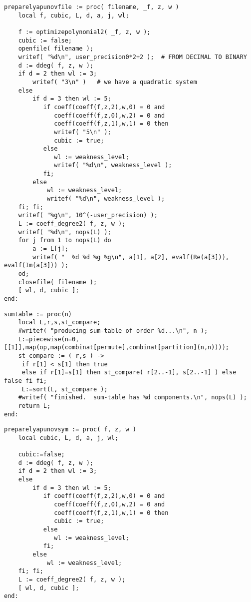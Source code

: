 \documentclass[a4paper,10pt]{article}
\begin{document}
\begin{lstlisting}[name=weakfocus]
preparelyapunovfile := proc( filename, _f, z, w )
    local f, cubic, L, d, a, j, wl;

    f := optimizepolynomial2( _f, z, w );
    cubic := false;
    openfile( filename );
    writef( "%d\n", user_precision0*2+2 );  # FROM DECIMAL TO BINARY
    d := ddeg( f, z, w );
    if d = 2 then wl := 3;
        writef( "3\n" )   # we have a quadratic system
    else
        if d = 3 then wl := 5;
           if coeff(coeff(f,z,2),w,0) = 0 and
              coeff(coeff(f,z,0),w,2) = 0 and
              coeff(coeff(f,z,1),w,1) = 0 then
              writef( "5\n" );
              cubic := true;
           else
              wl := weakness_level;
              writef( "%d\n", weakness_level );
           fi;
        else
            wl := weakness_level;
            writef( "%d\n", weakness_level );
    fi; fi;
    writef( "%g\n", 10^(-user_precision) );
    L := coeff_degree2( f, z, w );
    writef( "%d\n", nops(L) );
    for j from 1 to nops(L) do
        a := L[j];
        writef( "  %d %d %g %g\n", a[1], a[2], evalf(Re(a[3])), evalf(Im(a[3])) );
    od;
    closefile( filename );
    [ wl, d, cubic ];
end:
\end{lstlisting}

\begin{lstlisting}[name=weakfocus]
sumtable := proc(n)
    local L,r,s,st_compare;
    #writef( "producing sum-table of order %d...\n", n );
    L:=piecewise(n=0,[[1]],map(op,map(combinat[permute],combinat[partition](n,n))));
    st_compare := ( r,s ) ->
     if r[1] < s[1] then true
     else if r[1]=s[1] then st_compare( r[2..-1], s[2..-1] ) else false fi fi;
     L:=sort(L, st_compare );
    #writef( "finished.  sum-table has %d components.\n", nops(L) );
    return L;
end:
\end{lstlisting}

\begin{lstlisting}
preparelyapunovsym := proc( f, z, w )
    local cubic, L, d, a, j, wl;

    cubic:=false;
    d := ddeg( f, z, w );
    if d = 2 then wl := 3;
    else
        if d = 3 then wl := 5;
           if coeff(coeff(f,z,2),w,0) = 0 and
              coeff(coeff(f,z,0),w,2) = 0 and
              coeff(coeff(f,z,1),w,1) = 0 then
              cubic := true;
           else
              wl := weakness_level;
           fi;
        else
            wl := weakness_level;
    fi; fi;
    L := coeff_degree2( f, z, w );
    [ wl, d, cubic ];
end:
\end{lstlisting}
\end{document}
